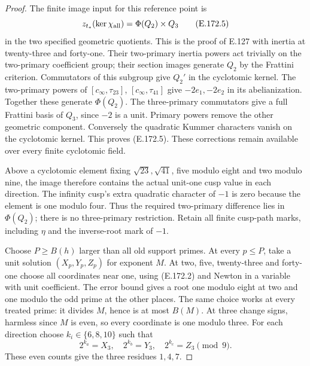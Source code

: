 \begin{proof}
The finite image input for this reference point is
\[
 z_{t_*}(\ker\chi_{\rm all})=\Phi(Q_2)\times Q_3
 \tag{E.172.5}
\]
in the two specified geometric quotients. This is the proof of
E.127 with inertia at twenty-three and forty-one. Their two-primary
inertia powers act trivially on the two-primary coefficient group;
their section images generate \(Q_2\) by the Frattini criterion.
Commutators of this subgroup give \(Q_2'\) in the cyclotomic
kernel. The two-primary powers of
\([c_\infty,\tau_{23}]\), \([c_\infty,\tau_{41}]\) give
\(-2e_1,-2e_2\) in its abelianization. Together these generate
\(\Phi(Q_2)\). The three-primary commutators give a full
Frattini basis of \(Q_3\), since \(-2\) is a unit.
Primary powers remove the other geometric component.
Conversely the quadratic Kummer characters vanish on the
cyclotomic kernel. This proves (E.172.5). These corrections
remain available over every finite cyclotomic field.

Above a cyclotomic element fixing \(\sqrt{23},\sqrt{41}\),
five modulo eight and two modulo nine, the image therefore
contains the actual unit-one cusp value in each direction.
The infinity cusp's extra quadratic character of \(-1\) is
zero because the element is one modulo four. Thus the required
two-primary difference lies in \(\Phi(Q_2)\); there is no
three-primary restriction. Retain all finite cusp-path marks,
including \(\eta\) and the inverse-root mark of \(-1\).

Choose \(P\ge B(h)\) larger than all old support primes.
At every \(p\le P\), take a unit solution
\((X_p,Y_p,Z_p)\) for exponent \(M\).
At two, five, twenty-three and forty-one choose all coordinates
near one, using (E.172.2) and Newton in a variable with unit
coefficient. The error bound gives a root one modulo eight at
two and one modulo the odd prime at the other places.
The same choice works at every treated prime: it divides
\(M\), hence is at most \(B(M)\).
At three change signs, harmless since \(M\) is even, so every
coordinate is one modulo three.
For each direction choose \(k_i\in\{6,8,10\}\) such that
\[
 2^{k_a}=X_3,\quad2^{k_b}=Y_3,\quad2^{k_c}=Z_3\pmod9.
 \tag{E.172.6}
\]
These even counts give the three residues \(1,4,7\).


\end{proof}
